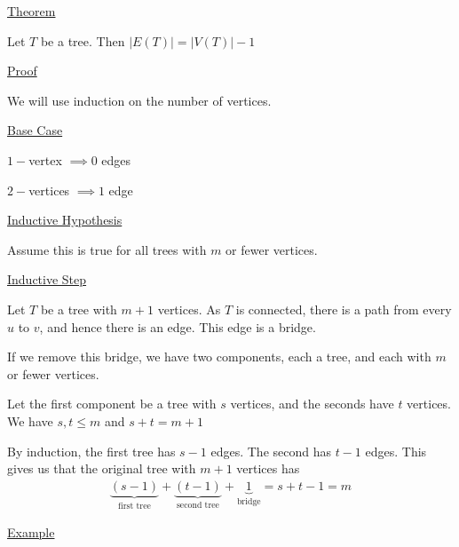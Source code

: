 \documentclass{article}
\begin{document}
\underline{Theorem}

Let $T$ be a tree. Then $|E(T)| = |V(T)| - 1$

\underline{Proof}

We will use induction on the number of vertices. 

\underline{Base Case}

$1-$vertex $\implies 0$ edges

$2-$vertices $\implies 1$ edge

\underline{Inductive Hypothesis}

Assume this is true for all trees with $m$ or fewer vertices. 

\underline{Inductive Step}

Let $T$ be a tree with $m+1$ vertices. As $T$ is connected, there is a path from every $u$ to $v$, and hence there is an edge. This edge is a bridge. 

If we remove this bridge, we have two components, each a tree, and each with $m$ or fewer vertices. 

Let the first component be a tree with $s$ vertices, and the seconds have $t$ vertices. We have $s,t \le m$ and $s + t = m + 1$

By induction, the first tree has $s-1$ edges. The second has $t-1$ edges. This gives us that the original tree with $m+1$ vertices has 
\begin{align*}
    \underbrace{(s-1)}_{\text{first tree}} + \underbrace{(t-1)}_{\text{second tree}} + \underbrace{1}_{\text{bridge}} = s + t - 1 = m
\end{align*}

\underline{Example}
\begin{center}
\end{center}
\end{document}
